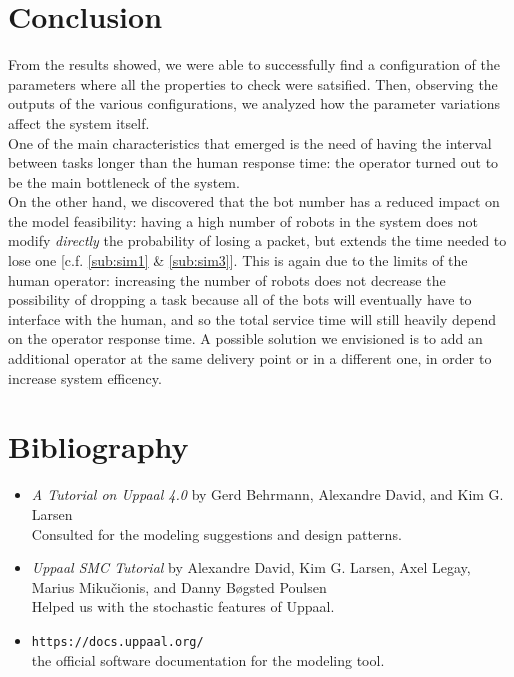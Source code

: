 \documentclass{article}
\begin{document}
	\section{Conclusion}
		From the results showed, we were able to successfully find a configuration of the parameters where all the properties to check were satsified. Then, observing the outputs of the various configurations, we analyzed how the parameter variations affect the system itself.\\
		One of the main characteristics that emerged is the need of having the interval between tasks longer than the human response time: the operator turned out to be the main bottleneck of the system.\\
		On the other hand, we discovered that the bot number has a reduced impact on the model feasibility: having a high number of robots in the system does not modify \emph{directly} the probability of losing a packet, but extends the time needed to lose one [c.f. \ref{sub:sim1} \& \ref{sub:sim3}]. This is again due to the limits of the human operator: increasing the number of robots does not decrease the possibility of dropping a task because all of the bots will eventually have to interface with the human, and so the total service time will still heavily depend on the operator response time. A possible solution we envisioned is to add an additional operator at the same delivery point or in a different one, in order to increase system efficency. 
	
	\section{Bibliography}
		\begin{itemize}
			\item \emph{A Tutorial on Uppaal 4.0} by Gerd Behrmann, Alexandre David, and Kim G. Larsen \\
				Consulted for the modeling suggestions and design patterns.
			\item \emph{Uppaal SMC Tutorial} by Alexandre David, Kim G. Larsen, Axel Legay, Marius Mikučionis, and Danny Bøgsted Poulsen \\
				Helped us with the stochastic features of Uppaal.
			\item \verb|https://docs.uppaal.org/| \\ the official software documentation for the modeling tool.
		\end{itemize}
		
\end{document}
